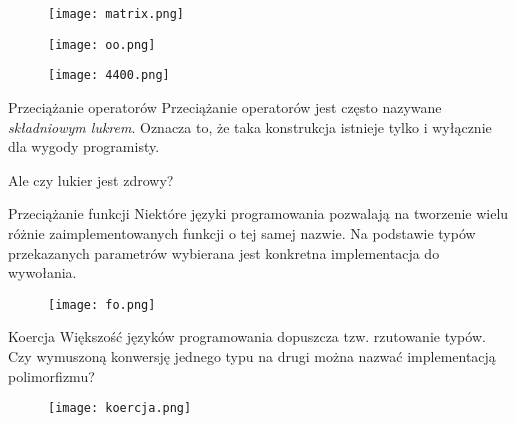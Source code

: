 \begin{frame}
	\begin{figure} \centering
		\texttt{[image: matrix.png]}
	\end{figure}
\end{frame}

\begin{frame}
	\begin{figure} \centering
		\texttt{[image: oo.png]}
	\end{figure}
\end{frame}

\begin{frame}
	\begin{figure} \centering
		\texttt{[image: 4400.png]}
	\end{figure}
\end{frame}

\begin{frame}{Przeciążanie operatorów}
	Przeciążanie operatorów jest często nazywane \emph{składniowym lukrem}. Oznacza to, że taka konstrukcja istnieje tylko i wyłącznie dla wygody programisty.
	
	Ale czy lukier jest zdrowy?
\end{frame}

\begin{frame}{Przeciążanie funkcji}
	Niektóre języki programowania pozwalają na tworzenie wielu różnie zaimplementowanych funkcji o tej samej nazwie. Na podstawie typów przekazanych parametrów wybierana jest konkretna implementacja do wywołania.
\end{frame}

\begin{frame}
	\begin{figure} \centering
		\texttt{[image: fo.png]}
	\end{figure}
\end{frame}

\begin{frame}{Koercja}
	Większość języków programowania dopuszcza tzw. rzutowanie typów. Czy wymuszoną konwersję jednego typu na drugi można nazwać implementacją polimorfizmu?
\end{frame}

\begin{frame}
	\begin{figure} \centering
		\texttt{[image: koercja.png]}
	\end{figure}
\end{frame}

